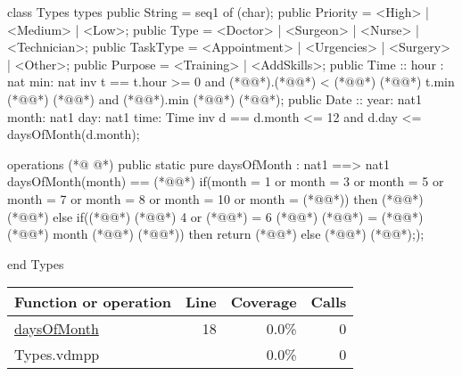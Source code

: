 \begin{vdmpp}[breaklines=true]
class Types
types
 public String = seq1 of (char);
 public Priority = <High> | <Medium> | <Low>;
 public Type = <Doctor> | <Surgeon> | <Nurse> | <Technician>;
 public TaskType = <Appointment> | <Urgencies> | <Surgery> | <Other>;
 public Purpose = <Training> | <AddSkills>;
 public Time :: hour : nat
         min: nat
 inv t == t.hour >= 0 and (*@@*).(*@@*) < (*@@*) (*@@*) t.min (*@\vdmnotcovered{>=}@*) (*@@*) and (*@@*).min (*@\vdmnotcovered{<}@*) (*@@*);
 public Date ::  year: nat1
         month: nat1
         day: nat1
         time: Time
 inv d == d.month <= 12 and d.day <= daysOfMonth(d.month);
 
operations
(*@
\label{daysOfMonth:18}
@*)
 public static pure daysOfMonth : nat1 ==> nat1
  daysOfMonth(month) == (*@\vdmnotcovered{(}@*)
              if(month = 1 or month = 3 or month = 5 or month = 7 or month = 8 or month = 10 or month = (*@@*))
               then (*@@*) (*@@*)
              else if((*@@*) (*@\vdmnotcovered{=}@*) 4 or (*@@*) = 6 (*@@*) (*@@*) = (*@@*) (*@@*) month (*@\vdmnotcovered{=}@*) (*@@*))
               then return (*@@*)
              else
               (*@@*) (*@@*););
                
end Types
\end{vdmpp}
\bigskip
\begin{longtable}{|l|r|r|r|}
\hline
Function or operation & Line & Coverage & Calls \\
\hline
\hline
\hyperref[daysOfMonth:18]{daysOfMonth} & 18&0.0\% & 0 \\
\hline
\hline
Types.vdmpp & & 0.0\% & 0 \\
\hline
\end{longtable}

